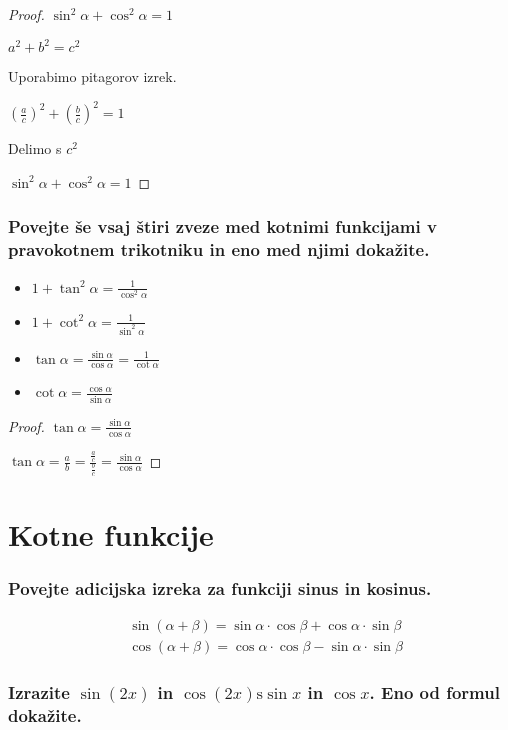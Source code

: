 \documentclass{article}
\begin{document}
\begin{proof}
    $\sin ^{2} \alpha+\cos ^{2} \alpha=1$

    $a^{2}+b^{2}=c^{2}$

Uporabimo pitagorov izrek.

$\left(\frac{a}{c}\right)^{2}+\left(\frac{b}{c}\right)^{2}=1$

Delimo s $c^{2}$

$\sin ^{2} \alpha+\cos ^{2} \alpha=1$
\end{proof}

\subsubsection*{Povejte še vsaj štiri zveze med kotnimi funkcijami v pravokotnem trikotniku in eno med njimi dokažite.}

\begin{itemize}
\item  $1+\tan ^{2} \alpha=\frac{1}{\cos ^{2} \alpha}$
\item  $1+\cot ^{2} \alpha=\frac{1}{\sin ^{2} \alpha}$
\item  $\tan \alpha=\frac{\sin \alpha}{\cos \alpha}=\frac{1}{\cot \alpha}$
\item $\cot \alpha=\frac{\cos \alpha}{\sin \alpha}$
\end{itemize}

\begin{proof}
    $\tan \alpha=\frac{\sin \alpha}{\cos \alpha}$

    $\tan \alpha=\frac{a}{b}=\frac{\frac{a}{c}}{\frac{b}{c}}=\frac{\sin \alpha}{\cos \alpha}$
\end{proof}
\section{Kotne funkcije}
\subsubsection*{Povejte adicijska izreka za funkciji sinus in kosinus.}

$$
\begin{aligned}
& \sin (\alpha+\beta)=\sin \alpha \cdot \cos \beta+\cos \alpha \cdot \sin \beta \\
& \cos (\alpha+\beta)=\cos \alpha \cdot \cos \beta-\sin \alpha \cdot \sin \beta
\end{aligned}
$$

\subsubsection*{Izrazite $\sin (2 x)$ in $\cos (2 x) \mathrm{s} \sin x$ in $\cos x$. Eno od formul dokažite.}
\end{document}
